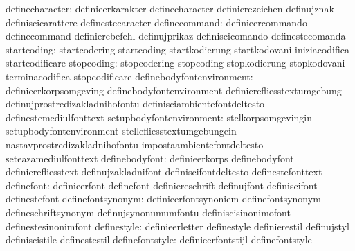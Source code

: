                  definecharacter: definieerkarakter                definecharacter
                                  definierezeichen                 definujznak
                                  definiscicarattere               definestecaracter
                   definecommand: definieercommando                definecommand
                                  definierebefehl                  definujprikaz
                                  definiscicomando                 definestecomanda
                     startcoding: startcodering                    startcoding
                                  startkodierung                   startkodovani
                                  iniziacodifica                   startcodificare
                      stopcoding: stopcodering                     stopcoding
                                  stopkodierung                    stopkodovani
                                  terminacodifica                  stopcodificare
       definebodyfontenvironment: definieerkorpsomgeving           definebodyfontenvironment
                                  definierefliesstextumgebung      definujprostredizakladnihofontu
                                  definisciambientefontdeltesto    definestemediulfonttext
        setupbodyfontenvironment: stelkorpsomgevingin              setupbodyfontenvironment
                                  stellefliesstextumgebungein      nastavprostredizakladnihofontu
                                  impostaambientefontdeltesto      seteazamediulfonttext
                  definebodyfont: definieerkorps                   definebodyfont
                                  definierefliesstext              definujzakladnifont
                                  definiscifontdeltesto            definestefonttext
                      definefont: definieerfont                    definefont
                                  definiereschrift                 definujfont
                                  definiscifont                    definestefont
               definefontsynonym: definieerfontsynoniem            definefontsynonym
                                  defineschriftsynonym             definujsynonumumfontu
                                  definiscisinonimofont            definestesinonimfont
                     definestyle: definieerletter                  definestyle
                                  definierestil                    definujstyl
                                  definiscistile                   definestestil
                 definefontstyle: definieerfontstijl               definefontstyle
